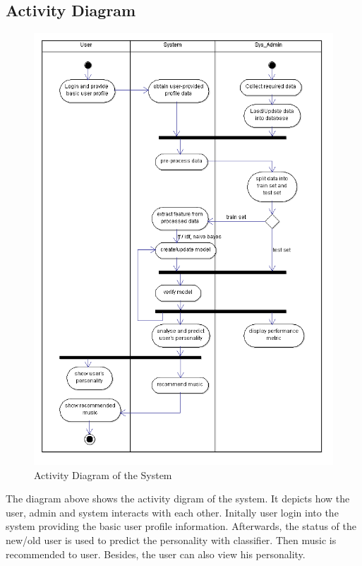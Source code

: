 \subsection{Activity Diagram}
\begin{figure}[!ht]
\centering
\includegraphics[width = 12 cm]{fig/Activity.png}
\caption{Activity Diagram of the System}
\label{fig:activity}
\end{figure}
The diagram above shows the activity digram of the system. It depicts how the user, admin and system interacts with each other. Initally user login into the system providing the basic user profile information. Afterwards, the status of the new/old user is used to predict the personality with classifier. Then music is recommended to user. Besides, the user can also view his personality.

\newpage
